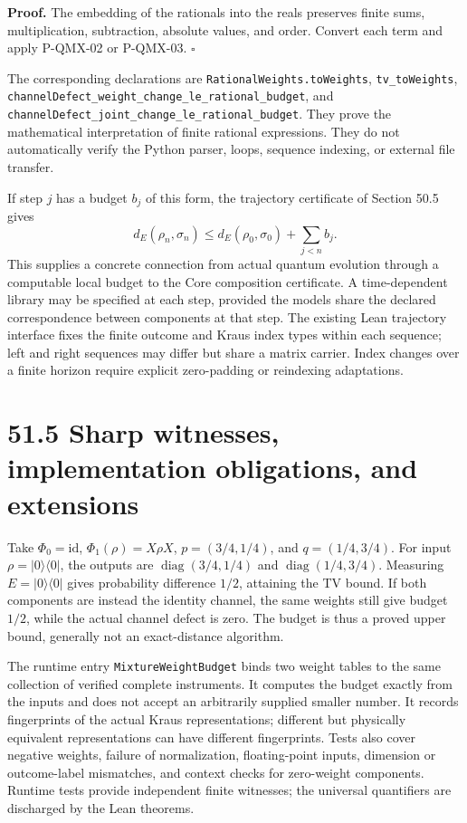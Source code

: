 \documentclass[
  11pt,
  oneside]{book}
\begin{document}
\textbf{Proof.} The embedding of the rationals into the reals preserves
finite sums, multiplication, subtraction, absolute values, and order.
Convert each term and apply P-QMX-02 or P-QMX-03. \(\square\)

The corresponding declarations are \texttt{Rational\allowbreak Weights.\allowbreak to\allowbreak Weights},
\texttt{tv\_\allowbreak to\allowbreak Weights},
\texttt{channel\allowbreak Defect\_\allowbreak weight\_\allowbreak change\_\allowbreak le\_\allowbreak rational\_\allowbreak budget}, and
\texttt{channel\allowbreak Defect\_\allowbreak joint\_\allowbreak change\_\allowbreak le\_\allowbreak rational\_\allowbreak budget}. They prove
the mathematical interpretation of finite rational expressions. They do
not automatically verify the Python parser, loops, sequence indexing, or
external file transfer.

If step \(j\) has a budget \(b_j\) of this form, the trajectory
certificate of Section 50.5 gives \[
d_E(\rho_n,\sigma_n)\le d_E(\rho_0,\sigma_0)+\sum_{j<n}b_j.
\] This supplies a concrete connection from actual quantum evolution
through a computable local budget to the Core composition certificate. A
time-dependent library may be specified at each step, provided the
models share the declared correspondence between components at that
step. The existing Lean trajectory interface fixes the finite outcome
and Kraus index types within each sequence; left and right sequences may
differ but share a matrix carrier. Index changes over a finite horizon
require explicit zero-padding or reindexing adaptations.

\section{51.5 Sharp witnesses, implementation obligations, and
extensions}

Take \(\Phi_0=\mathrm{id}\), \(\Phi_1(\rho)=X\rho X\), \(p=(3/4,1/4)\),
and \(q=(1/4,3/4)\). For input \(\rho=|0\rangle\langle0|\), the outputs
are \(\operatorname{diag}(3/4,1/4)\) and
\(\operatorname{diag}(1/4,3/4)\). Measuring \(E=|0\rangle\langle0|\)
gives probability difference \(1/2\), attaining the TV bound. If both
components are instead the identity channel, the same weights still give
budget \(1/2\), while the actual channel defect is zero. The budget is
thus a proved upper bound, generally not an exact-distance algorithm.

The runtime entry \texttt{Mixture\allowbreak Weight\allowbreak Budget} binds two weight tables
to the same collection of verified complete instruments. It computes the
budget exactly from the inputs and does not accept an arbitrarily
supplied smaller number. It records fingerprints of the actual Kraus
representations; different but physically equivalent representations can
have different fingerprints. Tests also cover negative weights, failure
of normalization, floating-point inputs, dimension or outcome-label
mismatches, and context checks for zero-weight components. Runtime tests
provide independent finite witnesses; the universal quantifiers are
discharged by the Lean theorems.
\end{document}

